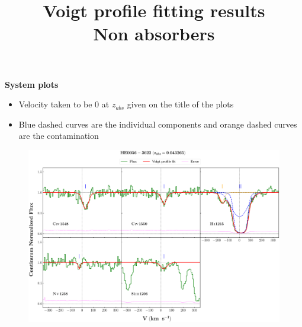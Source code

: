 \documentclass[12pt]{report}
\title{\textbf{Voigt profile fitting results} \\ 
 {Non \ion{O}{vi} absorbers}}
\begin{document}
\maketitle

\textbf{System plots} 

\begin{itemize}
    \item Velocity taken to be 0 at $z_{abs}$ given on the title of the plots
    \item Blue dashed curves are the individual components and orange dashed curves are the contamination
\end{itemize}


\newpage

\begin{landscape}

\begin{figure}
    \centering
    \vspace{-20mm}
    \hspace*{-35mm}
    \includegraphics[width=1.25\linewidth]{System-Plots/HE0056-3622_z=0.043265_sys_plot.png}
\end{figure}

\end{landscape}
\end{document}
